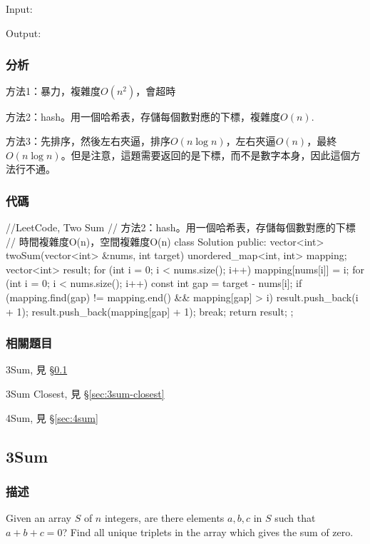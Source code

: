 Input:  

Output: 


\subsubsection{分析}
方法1：暴力，複雜度$O(n^2)$，會超時

方法2：hash。用一個哈希表，存儲每個數對應的下標，複雜度$O(n)$.

方法3：先排序，然後左右夾逼，排序$O(n\log n)$，左右夾逼$O(n)$，最終$O(n\log n)$。但是注意，這題需要返回的是下標，而不是數字本身，因此這個方法行不通。


\subsubsection{代碼}
\begin{Code}
//LeetCode, Two Sum
// 方法2：hash。用一個哈希表，存儲每個數對應的下標
// 時間複雜度O(n)，空間複雜度O(n)
class Solution {
public:
    vector<int> twoSum(vector<int> &nums, int target) {
        unordered_map<int, int> mapping;
        vector<int> result;
        for (int i = 0; i < nums.size(); i++) {
            mapping[nums[i]] = i;
        }
        for (int i = 0; i < nums.size(); i++) {
            const int gap = target - nums[i];
            if (mapping.find(gap) != mapping.end() && mapping[gap] > i) {
                result.push_back(i + 1);
                result.push_back(mapping[gap] + 1);
                break;
            }
        }
        return result;
    }
};
\end{Code}


\subsubsection{相關題目}
\begindot
\item 3Sum, 見 \S \ref{sec:3sum}
\item 3Sum Closest, 見 \S \ref{sec:3sum-closest}
\item 4Sum, 見 \S \ref{sec:4sum}
\myenddot


\subsection{3Sum} %
\label{sec:3sum}


\subsubsection{描述}
Given an array $S$ of $n$ integers, are there elements $a, b, c$ in $S$ such that $a + b + c = 0$? Find all unique triplets in the array which gives the sum of zero.

